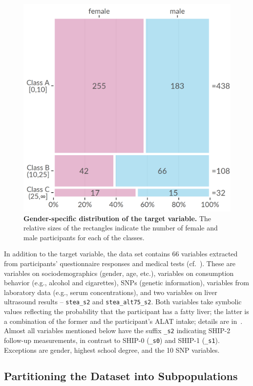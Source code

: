 \documentclass[
  oneside]{book}
\begin{document}
\begin{figure}[h]

{\centering \includegraphics[width=0.5\linewidth]{figures/03-fatty-liver-mosaic} 

}

\caption{\textbf{Gender-specific distribution of the target variable.} The relative sizes of the rectangles indicate the number of female and male participants for each of the classes.}\label{fig:03-fatty-liver-mosaic}
\end{figure}

In addition to the target variable, the data set contains 66 variables extracted from participants' questionnaire responses and medical tests (cf.~\autocite{Voelzke:SHIP2011}).
These are variables on sociodemographics (gender, age, etc.),
variables on consumption behavior (e.g., alcohol and cigarettes), SNPs (genetic information), variables from laboratory data (e.g., serum concentrations), and two variables on liver ultrasound results -- \texttt{stea\_s2} and \texttt{stea\_alt75\_s2}.
Both variables take symbolic values reflecting the probability that the participant has a fatty liver; the latter is a combination of the former and the participant's ALAT intake; details are in~\autocite{Voelzke:SHIP2011}.
Almost all variables mentioned below have the suffix \texttt{\_s2} indicating SHIP-2 follow-up measurements, in contrast to SHIP-0 (\texttt{\_s0}) and SHIP-1 (\texttt{\_s1}).
Exceptions are gender, highest school degree, and the 10 SNP variables.

\hypertarget{imm-workflow-partitioning}{%
\subsection{Partitioning the Dataset into Subpopulations}\label{imm-workflow-partitioning}}
\end{document}
